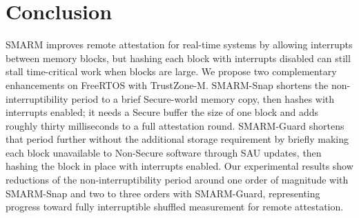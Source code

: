 \documentclass[conference]{IEEEtran}
\newcommand{\tdis}{$t_{\mathrm{disabled}}$\xspace}
\newcommand{\smarmcopy}{SMARM-Snap\xspace}
\newcommand{\smarmlock}{SMARM-Guard\xspace}
\begin{document}
\section{Conclusion}
\label{sec:conclusion}
SMARM improves remote attestation for real-time systems by allowing
interrupts between memory blocks, but hashing each block with interrupts
disabled can still stall time-critical work when blocks are large.
We propose two complementary enhancements on FreeRTOS with TrustZone-M.
\smarmcopy{} shortens the non-interruptibility period to a brief Secure-world
memory copy, then hashes with interrupts enabled; it needs a Secure buffer
the size of one block and adds roughly thirty milliseconds to a full
attestation round.
\smarmlock{} shortens that period further without the additional storage requirement by briefly
making each block unavailable to Non-Secure software through SAU updates,
then hashing the block in place with interrupts enabled.
Our experimental results show reductions of the non-interruptibility period around one order of magnitude with \smarmcopy and two to three orders with \smarmlock, representing progress toward fully interruptible shuffled measurement for remote attestation.



{\footnotesize


}
\end{document}
